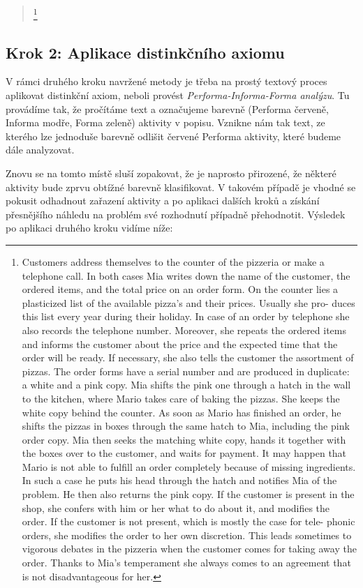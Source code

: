 \documentclass[]{article}
\begin{document}
\begin{quote}
\footnote{Customers address themselves to the counter of the pizzeria or make a telephone call. In both cases Mia writes down the name of the customer, the ordered items, and the total price on an order form. On the counter lies a plasticized list of the available pizza’s and their prices. Usually she pro- duces this list every year during their holiday. In case of an order by telephone she also records the telephone number. Moreover, she repeats the ordered items and informs the customer about the price and the expected time that the order will be ready. If necessary, she also tells the customer the assortment of pizzas. The order forms have a serial number and are produced in duplicate: a white and a pink copy. Mia shifts the pink one through a hatch in the wall to the kitchen, where Mario takes care of baking the pizzas. She keeps the white copy behind the counter. As soon as Mario has finished an order, he shifts the pizzas in boxes through the same hatch to Mia, including the pink order copy. Mia then seeks the matching white copy, hands it together with the boxes over to the customer, and waits for payment. It may happen that Mario is not able to fulfill an order completely because of missing ingredients. In such a case he puts his head through the hatch and notifies Mia of the problem. He then also returns the pink copy. If the customer is present in the shop, she confers with him or her what to do about it, and modifies the order. If the customer is not present, which is mostly the case for tele- phonic orders, she modifies the order to her own discretion. This leads sometimes to vigorous debates in the pizzeria when the customer comes for taking away the order. Thanks to Mia’s temperament she always comes to an agreement that is not disadvantageous for her.}
\end{quote}

\subsection{Krok 2: Aplikace distinkčního axiomu}
V rámci druhého kroku navržené metody je třeba na prostý textový proces aplikovat distinkční axiom, neboli provést \textit{Performa-Informa-Forma analýzu}. Tu provádíme tak, že pročítáme text a označujeme barevně (Performa červeně, Informa modře, Forma zeleně) aktivity v popisu. Vznikne nám tak text, ze kterého lze jednoduše barevně odlišit červené Performa aktivity, které budeme dále analyzovat.

Znovu se na tomto místě sluší zopakovat, že je naprosto přirozené, že některé aktivity bude zprvu obtížné barevně klasifikovat. V takovém případě je vhodné se pokusit odhadnout zařazení aktivity a po aplikaci dalších kroků a získání přesnějšího náhledu na problém své rozhodnutí případně přehodnotit. Výsledek po aplikaci druhého kroku vidíme níže:
\end{document}
